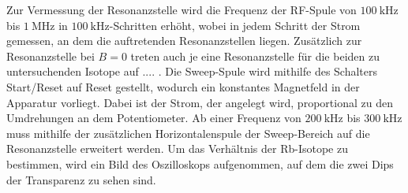Zur Vermessung der Resonanzstelle wird die Frequenz der RF-Spule von $\SI{100}{\kilo \hertz}$ bis $\SI{1}{\mega \hertz}$ in $\SI{100}{\kilo \hertz}$-Schritten erhöht, wobei in jedem Schritt der Strom gemessen, an dem die auftretenden Resonanzstellen liegen. Zusätzlich zur Resonanzstelle bei $B = 0$ treten auch je eine Resonanzstelle für die beiden zu untersuchenden Isotope auf .... . Die Sweep-Spule wird mithilfe des Schalters Start/Reset auf Reset gestellt, wodurch ein konstantes Magnetfeld in der Apparatur vorliegt. Dabei ist der Strom, der angelegt wird, proportional zu den Umdrehungen an dem Potentiometer. Ab einer Frequenz von $\SI{200}{\kilo \hertz}$ bis $\SI{300}{\kilo \hertz}$ muss mithilfe der zusätzlichen Horizontalenspule der Sweep-Bereich auf die Resonanzstelle erweitert werden. Um das Verhältnis der Rb-Isotope zu bestimmen, wird ein Bild des Oszilloskops aufgenommen, auf dem die zwei Dips der Transparenz zu sehen sind.
